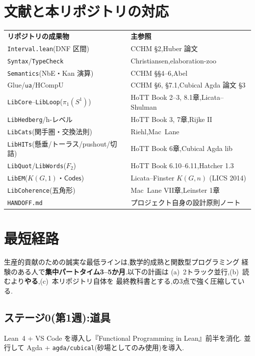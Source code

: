\documentclass[11pt]{ltjsarticle}
\newcommand{\op}[1]{\ensuremath{\mathsf{#1}}}
\begin{document}
\section{文献と本リポジトリの対応}

\begin{center}
\begin{tabular}{ll}
\textbf{リポジトリの成果物} & \textbf{主参照}\\[2pt]
\texttt{Interval.lean}(DNF 区間) & CCHM \S2,Huber 論文\\
\texttt{Syntax}/\texttt{TypeCheck} & Christiansen,elaboration-zoo\\
\texttt{Semantics}(NbE・Kan 演算) & CCHM \S\S4--6,Abel\\
Glue/\op{ua}/HCompU & CCHM \S6, \S7.1,Cubical Agda 論文 \S3\\
\texttt{LibCore}--\texttt{LibLoop}($\pi_1(S^1)$) & HoTT Book 2--3, 8.1章,Licata--Shulman\\
\texttt{LibHedberg}/h-レベル & HoTT Book 3, 7章,Rijke II\\
\texttt{LibCats}(関手圏・交換法則) & Riehl,Mac~Lane\\
\texttt{LibHITs}(懸垂/トーラス/pushout/切詰) & HoTT Book 6章,Cubical Agda lib\\
\texttt{LibQuot}/\texttt{LibWords}($F_2$) & HoTT Book 6.10--6.11,Hatcher 1.3\\
\texttt{LibEM}($K(G,1)$・\op{Codes}) & Licata--Finster $K(G,n)$ (LICS 2014)\\
\texttt{LibCoherence}(五角形) & Mac~Lane VII章,Leinster 1章\\
\texttt{HANDOFF.md} & プロジェクト自身の設計原則ノート
\end{tabular}
\end{center}

\section{最短経路}

生産的貢献のための誠実な最低ラインは,数学的成熟と関数型プログラミング
経験のある人で\textbf{集中パートタイム3--5か月}.以下の計画は
(a)~2トラック並行,(b)~読むより\textbf{やる},(c)~本リポジトリ自体を
最終教科書とする,の3点で強く圧縮している.

\subsection*{ステージ0(第1週):道具}
Lean~4 + VS Code を導入し『Functional Programming in Lean』前半を消化.
並行して Agda + \texttt{agda/cubical}(砂場としてのみ使用)を導入.
\end{document}
